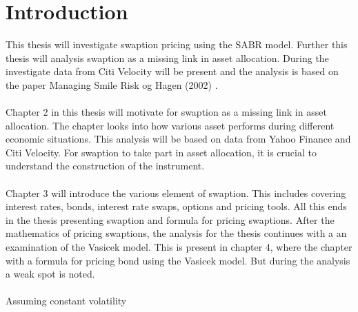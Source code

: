 \section{Introduction}
This thesis will investigate swaption pricing 
using the SABR model. Further this 
thesis will analysis swaption as a missing 
link in asset allocation.
During the investigate data from Citi Velocity will be 
present and the analysis is based on the paper Managing
Smile Risk og Hagen (2002) \cite{Smile}.
\\\\
Chapter 2 in this thesis will motivate for 
swaption as a missing link in asset allocation.
The chapter looks into how various asset performs 
during different economic situations. 
This analysis will be based on data from Yahoo Finance 
and Citi Velocity.
For swaption to take part in asset allocation, it 
is crucial to understand the construction of
the instrument.
\\\\
Chapter 3 will introduce the various element 
of swaption. This includes covering interest rates, 
bonds, interest rate swaps, options and pricing tools. 
All this ends in the thesis presenting swaption and 
formula for pricing swaptions. After the mathematics of
pricing swaptions, the analysis for the thesis continues
with a an examination of the Vasicek model. 
This is present in chapter 4, where the chapter with 
a formula for pricing bond using the Vasicek model. 
But during the analysis a weak spot is noted. 
\\\\
Assuming constant volatility 